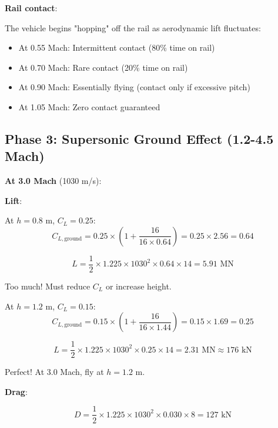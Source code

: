 \documentclass[12pt,a4paper]{article}
\begin{document}
\textbf{Rail contact}:

The vehicle begins "hopping" off the rail as aerodynamic lift fluctuates:
\begin{itemize}
\item At 0.55 Mach: Intermittent contact (80\% time on rail)
\item At 0.70 Mach: Rare contact (20\% time on rail)
\item At 0.90 Mach: Essentially flying (contact only if excessive pitch)
\item At 1.05 Mach: Zero contact guaranteed
\end{itemize}

\subsection{Phase 3: Supersonic Ground Effect (1.2-4.5 Mach)}

\textbf{At 3.0 Mach} (1030 m/s):

\textbf{Lift}:

At $h = 0.8$ m, $C_L = 0.25$:
\begin{equation}
C_{L,\text{ground}} = 0.25 \times \left(1 + \frac{16}{16 \times 0.64}\right) = 0.25 \times 2.56 = 0.64
\end{equation}

\begin{equation}
L = \frac{1}{2} \times 1.225 \times 1030^2 \times 0.64 \times 14 = 5.91 \text{ MN}
\end{equation}

Too much! Must reduce $C_L$ or increase height.

At $h = 1.2$ m, $C_L = 0.15$:
\begin{equation}
C_{L,\text{ground}} = 0.15 \times \left(1 + \frac{16}{16 \times 1.44}\right) = 0.15 \times 1.69 = 0.25
\end{equation}

\begin{equation}
L = \frac{1}{2} \times 1.225 \times 1030^2 \times 0.25 \times 14 = 2.31 \text{ MN} \approx 176 \text{ kN}
\end{equation}

Perfect! At 3.0 Mach, fly at $h = 1.2$ m.

\textbf{Drag}:

\begin{equation}
D = \frac{1}{2} \times 1.225 \times 1030^2 \times 0.030 \times 8 = 127 \text{ kN}
\end{equation}
\end{document}
